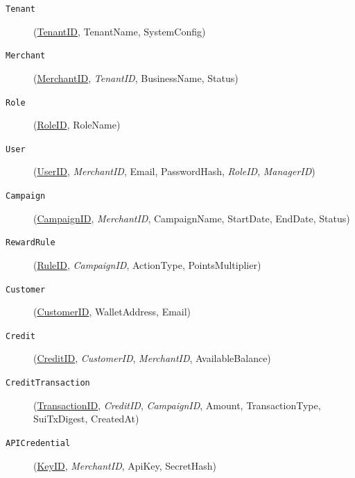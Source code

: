 \begin{description}
    \item[\texttt{Tenant}] (\underline{TenantID}, TenantName, SystemConfig)
    \item[\texttt{Merchant}] (\underline{MerchantID}, \textit{TenantID}, BusinessName, Status)
    \item[\texttt{Role}] (\underline{RoleID}, RoleName)
    \item[\texttt{User}] (\underline{UserID}, \textit{MerchantID}, Email, PasswordHash, \textit{RoleID}, \textit{ManagerID})
    \item[\texttt{Campaign}] (\underline{CampaignID}, \textit{MerchantID}, CampaignName, StartDate, EndDate, Status)
    \item[\texttt{RewardRule}] (\underline{RuleID}, \textit{CampaignID}, ActionType, PointsMultiplier)
    \item[\texttt{Customer}] (\underline{CustomerID}, WalletAddress, Email)
    \item[\texttt{Credit}] (\underline{CreditID}, \textit{CustomerID}, \textit{MerchantID}, AvailableBalance)
    \item[\texttt{CreditTransaction}] (\underline{TransactionID}, \textit{CreditID}, \textit{CampaignID}, Amount, TransactionType, SuiTxDigest, CreatedAt)
    \item[\texttt{APICredential}] (\underline{KeyID}, \textit{MerchantID}, ApiKey, SecretHash)
\end{description}
